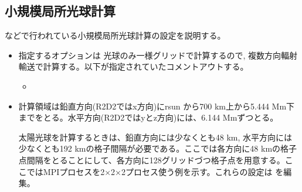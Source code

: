 \documentclass[letterpaper,10pt,dvipdfmx,report]{sphinxmanual}
\begin{document}
\subsection{小規模局所光球計算}
\label{\detokenize{typical_case:id3}}
\sphinxAtStartPar
{} などで行われている小規模局所光球計算の設定を説明する。
\begin{itemize}
\item {} \begin{description}
\sphinxAtStartPar
指定するオプションは
光球のみ一様グリッドで計算するので, 複数方向輻射輸送で計算する。以下が指定されていたコメントアウトする。
\begin{itemize}
\item {} 
\sphinxAtStartPar
{}

\end{itemize}

\end{description}

\item {} \begin{description}
\sphinxAtStartPar
計算領域は鉛直方向(R2D2ではx方向)にrsun から700 km上から5.444 Mm下までをとる。水平方向(R2D2ではyとz方向)には、6.144 Mmずつとる。

\sphinxAtStartPar
太陽光球を計算するときは、鉛直方向には少なくとも48 km, 水平方向には少なくとも192 kmの格子間隔が必要である。ここでは各方向に48 kmの格子点間隔をとることにして、各方向に128グリッドづつ格子点を用意する。ここではMPIプロセスを2×2×2プロセス使う例を示す。これらの設定は  を編集。

\begin{sphinxVerbatim}[commandchars=\\\{\}]


\end{sphinxVerbatim}
\end{description}
\end{itemize}
\end{document}
